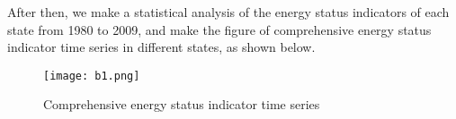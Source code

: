 \documentclass{mcmthesis}
\newcommand{\rmnum}[1]{\romannumeral #1}
\begin{document}
After then, we make a statistical analysis of the energy status indicators of each state from 1980 to 2009, and make the figure of comprehensive energy status indicator time series in different states, as shown below.
\begin{figure}[htb]
  \centering
  \texttt{[image: b1.png]}
  \caption{Comprehensive energy status indicator time series} \label{fig: Comprehensive energy status indicator time series}
\end{figure}

\newpage
\setcounter{page}{2}
\pagestyle{fancy} 
\rhead{\small\sffamily  \rmnum{\thepage}}






\begin{appendices}



\end{appendices}
\end{document}
